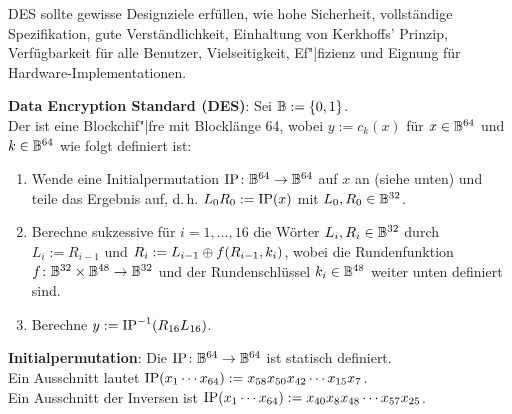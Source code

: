 DES sollte gewisse Designziele erfüllen,
wie hohe Sicherheit,
vollständige Spezifikation,
gute Verständlichkeit,
Einhaltung von Kerkhoffs' Prinzip,
Verfügbarkeit für alle Benutzer,
Vielseitigkeit,
Ef"|fizienz und
Eignung für Hardware-Implementationen.

\textbf{Data Encryption Standard (DES)}:
Sei $\mathbb{B} := \{0, 1\}$.\\
Der  ist eine Blockchif"|fre mit Blocklänge 64,
wobei $y := c_k(x)$ für $x \in \mathbb{B}^{64}$ und $k \in \mathbb{B}^{64}$ wie folgt definiert ist:
\begin{enumerate}
    \item
    Wende eine Initialpermutation $\operatorname{IP}\colon \mathbb{B}^{64} \rightarrow \mathbb{B}^{64}$ auf $x$ an
    (siehe unten) und teile das Ergebnis auf, d.\,h.
    $L_0 R_0 := \operatorname{IP}(x)$ mit $L_0, R_0 \in \mathbb{B}^{32}$.

    \item
    Berechne sukzessive für $i = 1, \dotsc, 16$ die Wörter $L_i, R_i \in \mathbb{B}^{32}$ durch\\
    $L_i := R_{i-1}$ und $R_i := L_{i-1} \oplus f(R_{i-1}, k_i)$,
    wobei die Rundenfunktion $f\colon \mathbb{B}^{32} \times \mathbb{B}^{48} \rightarrow \mathbb{B}^{32}$
    und der Rundenschlüssel $k_i \in \mathbb{B}^{48}$ weiter unten definiert sind.

    \item
    Berechne $y := \operatorname{IP}^{-1}(R_{16} L_{16})$.
\end{enumerate}

\linie
\pagebreak

\textbf{Initialpermutation}:
Die  $\operatorname{IP}\colon \mathbb{B}^{64} \rightarrow \mathbb{B}^{64}$ ist statisch
definiert.\\
Ein Ausschnitt lautet $\operatorname{IP}(x_1 \cdots x_{64}) := x_{58} x_{50} x_{42} \cdots x_{15} x_7$.\\
Ein Ausschnitt der Inversen ist $\operatorname{IP}(x_1 \cdots x_{64}) := x_{40} x_8 x_{48} \cdots x_{57} x_{25}$.

